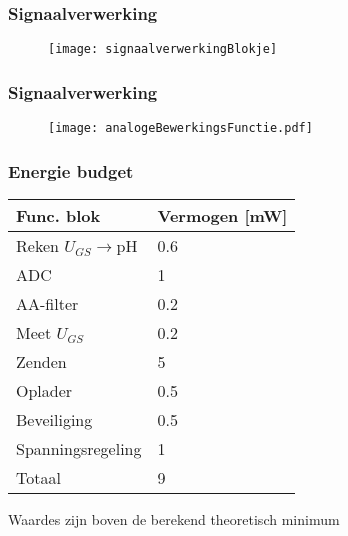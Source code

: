 \begin{frame}
    \frametitle{Signaalverwerking}

    \begin{figure}
        \centering
        \texttt{[image: signaalverwerkingBlokje]}
    \end{figure}

\end{frame}

\begin{frame}
    \frametitle{Signaalverwerking}

    \begin{figure}
        \centering
        \texttt{[image: analogeBewerkingsFunctie.pdf]}
    \end{figure}

\end{frame}

\begin{frame}
    \frametitle{Energie budget}
    \begin{table}[ht]
        \centering
        \begin{tabular}{l|l}
            Func. blok          & Vermogen [mW] \\
            \hline
            Reken $U_{GS}\rightarrow$pH & 0.6   \\
            ADC                 & 1             \\
            AA-filter           & 0.2           \\
            Meet $U_{GS}$       & 0.2           \\
            Zenden              & 5             \\
            Oplader             & 0.5           \\
            Beveiliging         & 0.5           \\
            Spanningsregeling   & 1             \\
            \hline
            \hline
            Totaal              & 9

        \end{tabular}
        \label{tab:energieBudgetEstimatie}
    \end{table}

    Waardes zijn boven de berekend theoretisch minimum
\end{frame}

